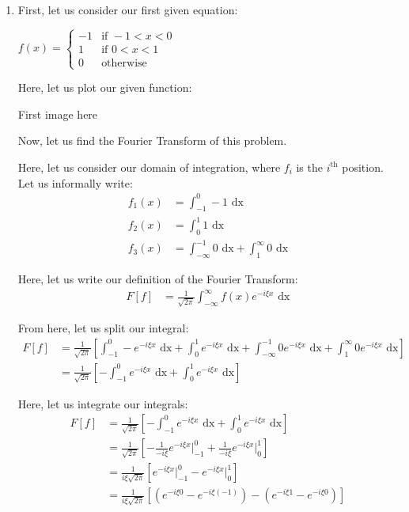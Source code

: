\begin{enumerate}
  \item First, let us consider our first given equation:

  $\displaystyle
  f(x) =
  \begin{cases}
    -1 & \text{if } -1 < x < 0\\
    1 &  \text{if } 0 < x < 1\\
    0 & \text{otherwise}
  \end{cases}
  $

  Here, let us plot our given function:

  \begin{center}
    First image here%
  \end{center}

  Now, let us find the Fourier Transform of this problem.

  Here, let us consider our domain of integration, where $f_i$ is the $i^{\text{th}}$ position. Let us informally write:
  \begin{align}
    f_1(x) & = \int^0_{-1} -1 \text{ dx}\\
    f_2(x) & = \int^1_0 1 \text{ dx}\\
    f_3(x) & = \int^{-1}_{-\infty} 0 \text{ dx} + \int^\infty_1 0 \text{ dx}
  \end{align}

Here, let us write our definition of the Fourier Transform:
%
\begin{align}
  F[f] & = \frac{1}{\sqrt{2 \pi}} \int^\infty_{-\infty} f(x) e^{-i \xi x} \text{ dx}
\end{align}

From here, let us split our integral:
%
\begin{align}
  F[f]
  & =
  \frac{1}{\sqrt{2 \pi}}
  \left[
    \int^0_{-1} -           e^{-i \xi x}  \text{ dx}
  + \int^1_0                e^{-i \xi x}  \text{ dx}
  + \int^{-1}_{- \infty}  0 e^{-i \xi x}  \text{ dx}
  + \int^\infty_1         0 e^{-i \xi x}  \text{ dx}
  \right]\\
  & =
  \frac{1}{\sqrt{2 \pi}}
  \left[
  - \int^0_{-1} e^{-i \xi x} \text{ dx}
  + \int^1_0    e^{-i \xi x} \text{ dx}
  \right]
\end{align}

Here, let us integrate our integrals:
%
\begin{align}
  F[f]
  & =
  \frac{1}{\sqrt{2 \pi}}
  \left[
  - \int^0_{-1} e^{-i \xi x} \text{ dx}
  + \int^1_0    e^{-i \xi x} \text{ dx}
  \right]\\
  & =
  \frac{1}{\sqrt{2 \pi}}
  \left[
  - \frac{1}{-i \xi} e^{-i \xi x} \Big|^0_{-1}
  + \frac{1}{-i \xi} e^{-i \xi x} \Big|^1_0
  \right]\\
  & =
  \frac{1}{i \xi \sqrt{2 \pi}}
  \left[
    e^{-i \xi x} \Big|^0_{-1}
  - e^{-i \xi x} \Big|^1_0
  \right]\\
  & =
  \frac{1}{i \xi \sqrt{2 \pi}}
  \left[
  \left(
  e^{-i \xi 0} - e^{-i \xi (-1)}
  \right)
  -
  \left(
  e^{-i \xi 1} - e^{-i \xi 0}
  \right)
  \right]\\
\end{align}


\end{enumerate}
